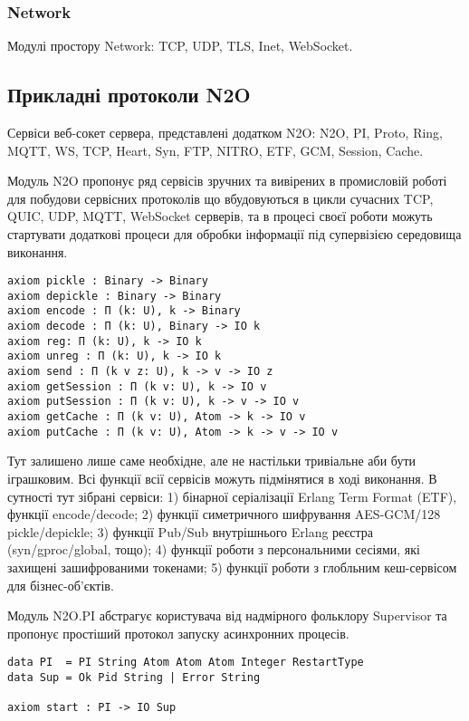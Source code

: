 \subsubsection{Network}
Модулі простору Network: TCP, UDP, TLS, Inet, WebSocket.

\newpage
\subsection{Прикладні протоколи N2O}
Сервіси веб-сокет сервера, представлені додатком N2O: N2O, PI, Proto,
Ring, MQTT, WS, TCP, Heart, Syn, FTP, NITRO, ETF, GCM, Session, Cache.

Модуль N2O пропонує ряд сервісів зручних та вивірених в промисловій роботі для побудови
сервісних протоколів що вбудовуються в цикли сучасних TCP, QUIC, UDP, MQTT, WebSocket серверів,
та в процесі своєї роботи можуть стартувати додаткові процеси для обробки інформації під
супервізією середовища виконання.

\begin{lstlisting}
axiom pickle : Binary -> Binary
axiom depickle : Binary -> Binary
axiom encode : Π (k: U), k -> Binary
axiom decode : Π (k: U), Binary -> IO k
axiom reg: Π (k: U), k -> IO k
axiom unreg : Π (k: U), k -> IO k
axiom send : Π (k v z: U), k -> v -> IO z
axiom getSession : Π (k v: U), k -> IO v
axiom putSession : Π (k v: U), k -> v -> IO v
axiom getCache : Π (k v: U), Atom -> k -> IO v
axiom putCache : Π (k v: U), Atom -> k -> v -> IO v
\end{lstlisting}

Тут залишено лише саме необхідне, але не настільки тривіальне аби бути іграшковим.
Всі функції всії сервісів можуть підмінятися в ході виконання.
В сутності тут зібрані сервіси:
1) бінарної серіалізації Erlang Term Format (ETF), функції encode/decode;
2) функції симетричного шифрування AES-GCM/128 pickle/depickle;
3) функції Pub/Sub внутрішнього Erlang реєстра (syn/gproc/global, тощо);
4) функції роботи з персональними сесіями, які захищені зашифрованими токенами;
5) функції роботи з глобльним кеш-сервісом для бізнес-об'єктів.

Модуль N2O.PI абстрагує користувача від надмірного
фольклору Supervisor та пропонує простіший протокол запуску
асинхронних процесів.

\begin{lstlisting}
data PI  = PI String Atom Atom Atom Integer RestartType
data Sup = Ok Pid String | Error String

axiom start : PI -> IO Sup
\end{lstlisting}

